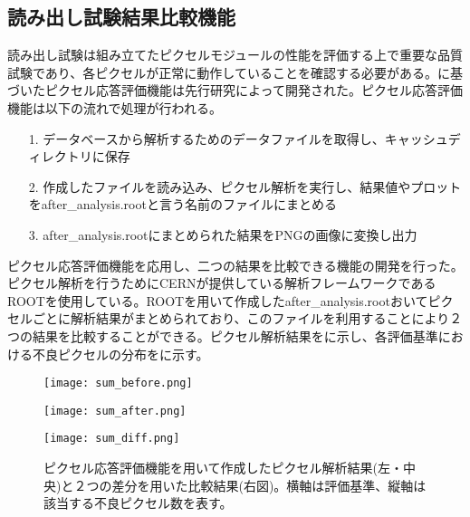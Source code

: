 \subsection{読み出し試験結果比較機能}
\label{sec:elec-hikaku}

読み出し試験は組み立てたピクセルモジュールの性能を評価する上で重要な品質試験であり、各ピクセルが正常に動作していることを確認する必要がある。に基づいたピクセル応答評価機能は先行研究\cite{oku}によって開発された。ピクセル応答評価機能は以下の流れで処理が行われる。
\begin{itemize}
  \item[1. ] データベースから解析するためのデータファイルを取得し、キャッシュディレクトリに保存
  \item[2. ] 作成したファイルを読み込み、ピクセル解析を実行し、結果値やプロットをafter\_analysis.rootと言う名前のファイルにまとめる
  \item[3. ] after\_analysis.rootにまとめられた結果をPNGの画像に変換し出力
\end{itemize}

ピクセル応答評価機能を応用し、二つの結果を比較できる機能の開発を行った。ピクセル解析を行うためにCERNが提供している解析フレームワークであるROOTを使用している。ROOTを用いて作成したafter\_analysis.rootおいてピクセルごとに解析結果がまとめられており、このファイルを利用することにより２つの結果を比較することができる。ピクセル解析結果をに示し、各評価基準における不良ピクセルの分布をに示す。

\begin{figure}[tbp]
 \begin{minipage}{0.33\hsize}
  \begin{center}
   \texttt{[image: sum\_before.png]}
  \end{center}
 \end{minipage}
 \begin{minipage}{0.33\hsize}
 \begin{center}
  \texttt{[image: sum\_after.png]}
 \end{center}
 \end{minipage}
 \begin{minipage}{0.33\hsize}
 \begin{center}
  \texttt{[image: sum\_diff.png]}
 \end{center}
 \end{minipage}
 \caption[ピクセル応答評価機能を用いて作成したピクセル解析結果と２つの差分を用いた比較結果]{ピクセル応答評価機能を用いて作成したピクセル解析結果(左・中央)と２つの差分を用いた比較結果(右図)。横軸は評価基準、縦軸は該当する不良ピクセル数を表す。}
 \label{fig:badsum}
\end{figure}

